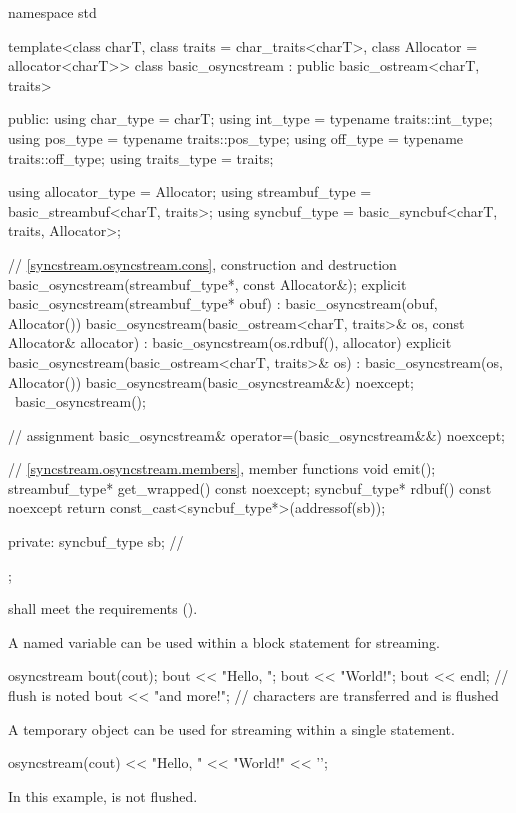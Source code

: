 %
\begin{codeblock}
namespace std {
  template<class charT, class traits = char_traits<charT>, class Allocator = allocator<charT>>
  class basic_osyncstream : public basic_ostream<charT, traits> {
  public:
    using char_type   = charT;
    using int_type    = typename traits::int_type;
    using pos_type    = typename traits::pos_type;
    using off_type    = typename traits::off_type;
    using traits_type = traits;

    using allocator_type = Allocator;
    using streambuf_type = basic_streambuf<charT, traits>;
    using syncbuf_type   = basic_syncbuf<charT, traits, Allocator>;

    // \ref{syncstream.osyncstream.cons}, construction and destruction
    basic_osyncstream(streambuf_type*, const Allocator&);
    explicit basic_osyncstream(streambuf_type* obuf)
      : basic_osyncstream(obuf, Allocator()) {}
    basic_osyncstream(basic_ostream<charT, traits>& os, const Allocator& allocator)
      : basic_osyncstream(os.rdbuf(), allocator) {}
    explicit basic_osyncstream(basic_ostream<charT, traits>& os)
      : basic_osyncstream(os, Allocator()) {}
    basic_osyncstream(basic_osyncstream&&) noexcept;
    ~basic_osyncstream();

    // assignment
    basic_osyncstream& operator=(basic_osyncstream&&) noexcept;

    // \ref{syncstream.osyncstream.members}, member functions
    void emit();
    streambuf_type* get_wrapped() const noexcept;
    syncbuf_type* rdbuf() const noexcept { return const_cast<syncbuf_type*>(addressof(sb)); }

  private:
    syncbuf_type sb;    // \expos
  };
}
\end{codeblock}

\pnum
{} shall meet the  requirements
().

\pnum
\begin{example}
A named variable can be used within a block statement for streaming.
\begin{codeblock}
{
  osyncstream bout(cout);
  bout << "Hello, ";
  bout << "World!";
  bout << endl; // flush is noted
  bout << "and more!\n";
}   // characters are transferred and  is flushed
\end{codeblock}
\end{example}

\pnum
\begin{example}
A temporary object can be used for streaming within a single statement.
\begin{codeblock}
osyncstream(cout) << "Hello, " << "World!" << '\n';
\end{codeblock}
In this example,  is not flushed.
\end{example}

